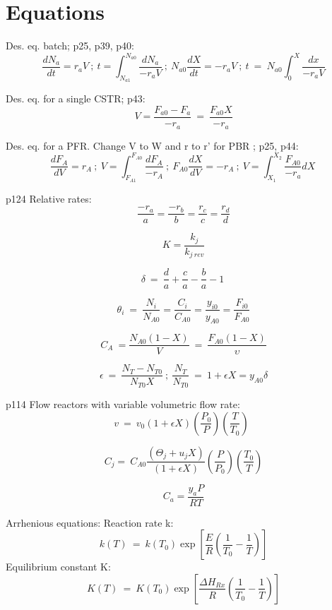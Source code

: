 \documentclass[8pt]{article}
\begin{document}
\twocolumn

\section*{Equations}

Des. eq. batch; p25, p39, p40: 
\[ \frac{dN_{a}}{dt}=r_{a}V \ ; \ t=\int_{N_{a1}}^{N_{a0}}\frac{dN_{a}}{-r_{a}V} \ ; \ N_{a0}\frac{dX}{dt}=-r_{a}V \ ; \ t\ =\ N_{a0}\int_{0}^{X}\frac{dx}{-r_{a}V}  \]

Des. eq. for a single CSTR; p43:
\[ V=\frac{F_{a0}-F_{a}}{-r_{a}} \ =\ \frac{F_{a0}X}{-r_{a}}  \]

 Des. eq. for a PFR. Change V to W and r to r' for PBR ; p25, p44:
\[ \frac{dF_{A}}{dV}=r_{A} \ ; \  V=\int_{F_{A1}}^{F_{A0}}\frac{dF_{A}}{-r_{A}} \ ; \ F_{A0}\frac{dX}{dV}=-r_{A} \ ;  \ V=\int_{X_1}^{X_2}\frac{F_{A0}}{-r_{a}}dX  \  \]



p124 Relative rates:
\[ \frac{-r_{a}}{a}=\frac{-r_{b}}{b}=\frac{r_{c}}{c}=\frac{r_{d}}{d} \]

\[ K=\frac{k_{j}}{k_{j \ rev}} \]

\[ \delta\ =\ \frac{d}{a}+\frac{c}{a}-\frac{b}{a}-1\ \]

\[ \theta_i \ =\ \frac{N_{i}}{N_{A0}}=\frac{C_{i}}{C_{A0}}=\frac{y_{i0}}{y_{A0}}=\frac{F_{i0}}{F_{A0}} \]


\[ C_A \ = \frac{N_{A0}(1-X)}{V} \ = \ \frac{F_{A0}(1-X)}{\upsilon} \]


 \[ \epsilon \ =\ \frac{N_{T}-N_{T0}}{N_{T0}X} \ ; \ \frac{N_T}{N_{T0}} \ = \ 1 + \epsilon X  =y_{A0}\delta \]


p114 Flow reactors with variable volumetric flow rate: 
 \[ v \ = \ v_{0} (1 + \epsilon X ) \left(\frac{P_{0}}{P}\right)\left(\frac{T}{T_{0}}\right) \  \ \]

\[ C_{j}=\ C_{A0}\frac{\left(\Theta_{j}+u_{j}X\right)}{\left(1+\epsilon X\right)}\left(\frac{P}{P_{0}}\right)\left(\frac{T_{0}}{T}\right)  \]

\[ C_{a}=\frac{y_{a}P}{RT}  \]

Arrhenious equations:  \newline
Reaction rate k:
\[ k\left(T\right)\ =\ k\left(T_{0}\right)\exp\left[\frac{E}{R}\left(\frac{1}{T_{0}}-\frac{1}{T}\right)\right] \]
Equilibrium constant K:
\[K\left(T\right)\ =\ K\left(T_{0}\right)\exp\left[\frac{\Delta H_{Rx}}{R}\left(\frac{1}{T_{0}}-\frac{1}{T}\right)\right]  \]
\end{document}
